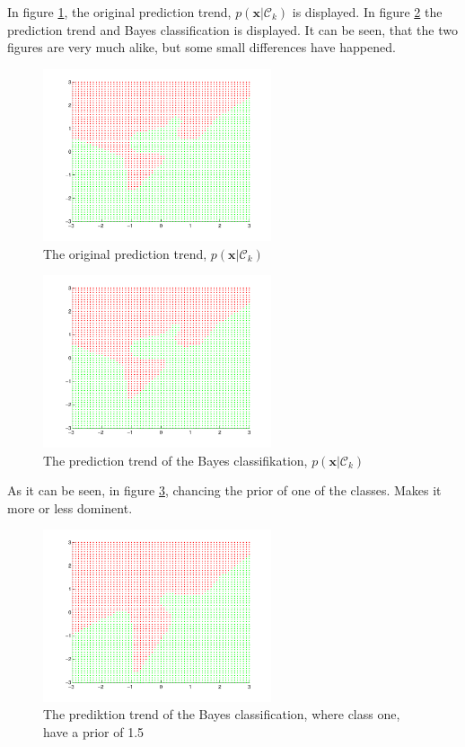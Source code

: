 In figure \ref{fig:q23a}, the original prediction trend,
$p(\mathbf{x}|\mathcal{C}_k)$ is displayed. In figure \ref{fig:q23b}
the prediction trend and Bayes classification is displayed. It can be
seen, that the two figures are very much alike, but some small
differences have happened.

\begin{figure}[!htbp]
  \centering
  \includegraphics[width=0.6\textwidth]{./images/q23a.pdf}
  \caption{The original prediction trend, $p(\mathbf{x}|\mathcal{C}_k)$}
  \label{fig:q23a}
\end{figure}

\begin{figure}[!htbp]
  \centering
  \includegraphics[width=0.6\textwidth]{./images/q23b.pdf}
  \caption{The prediction trend of the Bayes classifikation, $p(\mathbf{x}|\mathcal{C}_k)$}
  \label{fig:q23b}
\end{figure}

As it can be seen, in figure \ref{fig:q23c}, chancing the prior of one of
the classes. Makes it more or less dominent.

\begin{figure}[!htbp]
  \centering
  \includegraphics[width=0.6\textwidth]{./images/q23c.pdf}
  \caption{The prediktion trend of the Bayes classification, where class one, have a prior of 1.5}
  \label{fig:q23c}
\end{figure}
